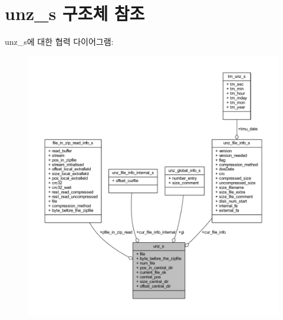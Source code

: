 \hypertarget{structunz__s}{}\section{unz\+\_\+s 구조체 참조}
\label{structunz__s}


unz\+\_\+s에 대한 협력 다이어그램\+:\nopagebreak
\begin{figure}[H]
\begin{center}
\leavevmode
\includegraphics[width=350pt]{structunz__s__coll__graph}
\end{center}
\end{figure}

